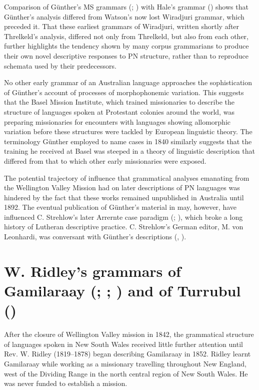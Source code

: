 Comparison of Günther’s MS grammars (\citeyear{gunther_native_1838}; \citeyear{gunther_lecture_1840}) with Hale’s grammar (\citeyear{hale_languages_1846}) shows that Günther’s analysis differed from Watson’s now lost Wiradjuri grammar, which preceded it. That these earliest grammars of Wiradjuri, written shortly after Threlkeld’s analysis, differed not only from Threlkeld, but also from each other, further highlights the tendency shown by many corpus grammarians to produce their own novel descriptive responses to PN structure, rather than to reproduce schemata used by their predecessors. 

No other early grammar of an Australian language approaches the sophistication of Günther’s account of processes of morphophonemic variation. This suggests that the Basel Mission Institute, which trained missionaries to describe the structure of languages spoken at Protestant colonies around the world, was preparing missionaries for encounters with languages showing allomorphic variation before these structures were tackled by European linguistic theory. The terminology Günther employed to name cases in 1840 similarly suggests that the training he received at Basel was steeped in a theory of linguistic description that differed from that to which other early missionaries were exposed.

The potential trajectory of influence that grammatical analyses emanating from the Wellington Valley Mission had on later descriptions of PN languages was hindered by the fact that these works remained unpublished in Australia until 1892. The eventual publication of Günther’s material in \citet{gunther_grammar_1892} may, however, have influenced C. Strehlow’s later Arrernte case paradigm (\citeyear{strehlow_einige_1908}; ), which broke a long history of Lutheran descriptive practice. C. Strehlow’s German editor, M. von Leonhardi, was conversant with Günther’s descriptions (, ).

\section[W. Ridley’s grammars of Gamilaraay and of Turrubul]{W. Ridley’s grammars of Gamilaraay (\citeyear{ridley_kamilaroi_1875}; \citeyear{ridley_kamilaroi_1855-1}; \citeyear{ridley_kamilaroi_1856}) and of Turrubul (\citeyear{ridley_kamilaroi_1866})}
\label{sec:key:4.5}
\label{sec:4.5}

After the closure of Wellington Valley mission in 1842, the grammatical structure of languages spoken in New South Wales received little further attention until Rev. W. Ridley (1819--1878) began describing Gamilaraay in 1852. Ridley learnt Gamilaraay while working as a missionary travelling throughout New England, west of the Dividing Range in the north central region of New South Wales. He was never funded to establish a mission.

